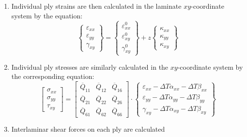 \documentclass{article}
\begin{document}
\begin{enumerate}
    \item Individual ply strains are then calculated in the laminate $xy$-coordinate system by the equation:
    \begin{equation}
        \left\{\begin{array}{c}
            \varepsilon_{xx} \\
            \varepsilon_{yy} \\
            \gamma_{xy}
        \end{array}\right\} =
        \left\{\begin{array}{c}
            \varepsilon_{xx}^{0} \\
            \varepsilon_{xy}^{0} \\
            \gamma_{xy}^{0}
        \end{array}\right\} +
        z \left\{\begin{array}{c}
            \kappa_{xx} \\
            \kappa_{yy} \\
            \kappa_{xy}
        \end{array}\right\}
    \end{equation}

    \item Individual ply stresses are similarly calculated in the $xy$-coordinate system by the corresponding equation:
    \begin{equation}
        \left[\begin{array}{c}
            \sigma_{xx} \\
            \sigma_{yy} \\
            \tau_{xy}
        \end{array}\right] =
        \left[ \begin{array}{ccc} \overline{Q}_{11} & \overline{Q}_{12} & \overline{Q}_{16} \\
                                  \overline{Q}_{21} & \overline{Q}_{22} & \overline{Q}_{26} \\
                                  \overline{Q}_{61} & \overline{Q}_{62} & \overline{Q}_{66}
        \end{array} \right] \cdot
        \left\{\begin{array}{c}
            \varepsilon_{xx} - \Delta T \alpha_{xx} - \Delta T \beta_{xx}\\
            \varepsilon_{yy} - \Delta T \alpha_{yy} - \Delta T \beta_{yy}\\
            \gamma_{xy} - \Delta T \alpha_{xy} - \Delta T \beta_{xy}
        \end{array}\right\}
    \end{equation}

    \item Interlaminar shear forces on each ply are calculated


\end{enumerate}
\end{document}

